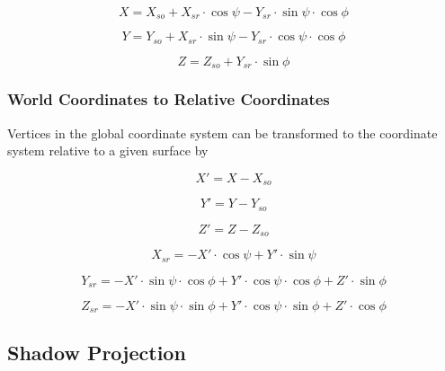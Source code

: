 \begin{equation}
X = {X_{so}} + {X_{sr}}\cdot \cos \psi  - {Y_{sr}}\cdot \sin \psi \cdot \cos \phi
\end{equation}

\begin{equation}
Y = {Y_{so}} + {X_{sr}}\cdot \sin \psi  - {Y_{sr}}\cdot \cos \psi \cdot \cos \phi
\end{equation}

\begin{equation}
Z = {Z_{so}} + {Y_{sr}}\cdot \sin \phi
\end{equation}

\subsubsection{World Coordinates to Relative Coordinates}\label{world-coordinates-to-relative-coordinates}

Vertices in the global coordinate system can be transformed to the coordinate system relative to a given surface by

\begin{equation}
{X'} = X - {X_{so}}
\end{equation}

\begin{equation}
{Y'} = Y - {Y_{so}}
\end{equation}

\begin{equation}
{Z'} = Z - {Z_{so}}
\end{equation}

\begin{equation}
{X_{sr}} =  - {X'}\cdot \cos \psi  + {Y'}\cdot \sin \psi
\end{equation}

\begin{equation}
{Y_{sr}} =  - {X'}\cdot \sin \psi \cdot \cos \phi  + {Y'}\cdot \cos \psi \cdot \cos \phi  + {Z'}\cdot \sin \phi
\end{equation}

\begin{equation}
{Z_{sr}} =  - {X'}\cdot \sin \psi \cdot \sin \phi  + {Y'}\cdot \cos \psi \cdot \sin \phi  + {Z'}\cdot \cos \phi
\label{eq:ZsrEquation}
\end{equation}

\subsection{Shadow Projection}\label{shadow-projection}

